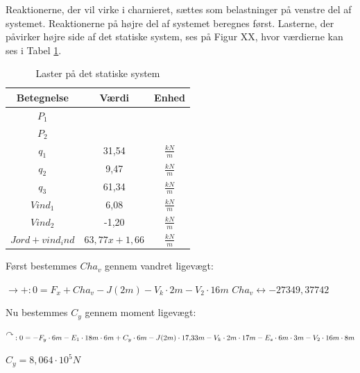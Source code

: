 Reaktionerne, der vil virke i charnieret, sættes som belastninger på venstre del af systemet. 
\newline
\newline
Reaktionerne på højre del af systemet beregnes først.
\newline
\newline
Lasterne, der påvirker højre side af det statiske system, ses på Figur XX, hvor værdierne kan ses i Tabel \ref{tab:laster}.

\begin{table}
	\begin{center}
		\begin{tabular}{|c|c|c|}
			\hline
Betegnelse     & Værdi & Enhed \\ \hline
$P_1$           &       &       \\ \hline
$P_2$           &       &       \\ \hline
$q_1$           & 31,54 & $\frac{kN}{m}$ \\ \hline
$q_2$           & 9,47  & $\frac{kN}{m}$ \\ \hline
$q_3$           & 61,34 & $\frac{kN}{m}$ \\ \hline
$Vind_1$        & 6,08  & $\frac{kN}{m}$ \\ \hline
$Vind_2$       	& -1,20 & $\frac{kN}{m}$ \\ \hline
$Jord+vind_ind$ & $63,\!77x + 1,\!66$ & $\frac{kN}{m}$ \\ \hline
		\end{tabular}
		\caption{Laster på det statiske system}
		\label{tab:laster}
	\end{center}
\end{table}

Først bestemmes $Cha_v$ gennem vandret ligevægt: 
\begin{center}
	$\rightarrow+:0=F_x+Cha_v-J(2m)-V_k\cdot2m-V_2\cdot16m$
	$Cha_v\leftrightarrow -27349,37742$
\end{center}

Nu bestemmes $C_y$ gennem moment ligevægt: 
\begin{center}
	$\AR{}:0 = -F_y \cdot 6 m - E_1 \cdot 18 m \cdot 6 m + C_y \cdot 6 m - J(2m) \cdot 17,\!33 m - V_k \cdot 2 m \cdot 17 m - E_s \cdot 6 m \cdot 3 m - V_2 \cdot 16 m \cdot 8 m$
\end{center}
\begin{center}
	$C_y = 8,\!064 \cdot 10^5 N$
\end{center}

